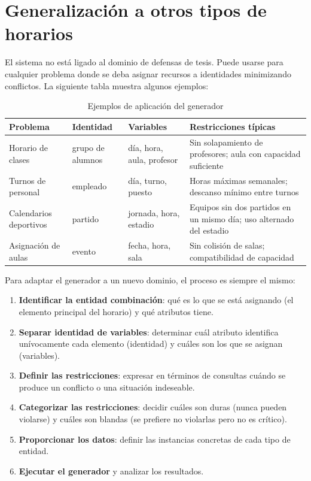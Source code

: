 \documentclass[12pt,a4paper]{article}
\begin{document}
\section{Generalización a otros tipos de horarios}
\label{sec:generalizacion}

El sistema no está ligado al dominio de defensas de tesis. Puede usarse
para cualquier problema donde se deba asignar recursos a identidades
minimizando conflictos. La siguiente tabla muestra algunos ejemplos:

\begin{table}[ht]
\centering
\caption{Ejemplos de aplicación del generador}
\begin{tabular}{@{}p{3cm}p{3.5cm}p{4cm}p{3cm}@{}}
\toprule
\textbf{Problema} & \textbf{Identidad} & \textbf{Variables} & \textbf{Restricciones típicas} \\
\midrule
Horario de clases & grupo de alumnos & día, hora, aula, profesor
  & Sin solapamiento de profesores; aula con capacidad suficiente \\
Turnos de personal & empleado & día, turno, puesto
  & Horas máximas semanales; descanso mínimo entre turnos \\
Calendarios deportivos & partido & jornada, hora, estadio
  & Equipos sin dos partidos en un mismo día; uso alternado del estadio \\
Asignación de aulas & evento & fecha, hora, sala
  & Sin colisión de salas; compatibilidad de capacidad \\
\bottomrule
\end{tabular}
\end{table}

Para adaptar el generador a un nuevo dominio, el proceso es siempre el mismo:

\begin{enumerate}
  \item \textbf{Identificar la entidad combinación}: qué es lo que se está
    asignando (el elemento principal del horario) y qué atributos tiene.
  \item \textbf{Separar identidad de variables}: determinar cuál atributo
    identifica unívocamente cada elemento (identidad) y cuáles son los
    que se asignan (variables).
  \item \textbf{Definir las restricciones}: expresar en términos de
    consultas cuándo se produce un conflicto o una situación indeseable.
  \item \textbf{Categorizar las restricciones}: decidir cuáles son duras
    (nunca pueden violarse) y cuáles son blandas (se prefiere no violarlas
    pero no es crítico).
  \item \textbf{Proporcionar los datos}: definir las instancias concretas
    de cada tipo de entidad.
  \item \textbf{Ejecutar el generador} y analizar los resultados.
\end{enumerate}
\end{document}
